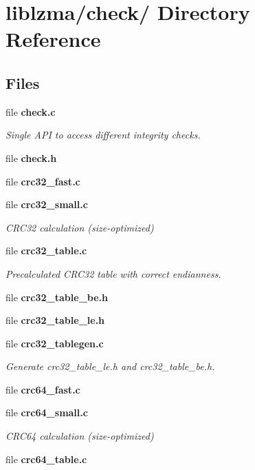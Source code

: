 \section{liblzma/check/ Directory Reference}
\label{dir_32e8ef00be12127410478e93c5f07fec}
\subsection*{Files}
\begin{DoxyCompactItemize}
\item 
file {\bf check.\-c}
\begin{DoxyCompactList}\small\item\em Single A\-P\-I to access different integrity checks. \end{DoxyCompactList}\item 
file {\bfseries check.\-h}
\item 
file {\bfseries crc32\-\_\-fast.\-c}
\item 
file {\bf crc32\-\_\-small.\-c}
\begin{DoxyCompactList}\small\item\em C\-R\-C32 calculation (size-\/optimized) \end{DoxyCompactList}\item 
file {\bf crc32\-\_\-table.\-c}
\begin{DoxyCompactList}\small\item\em Precalculated C\-R\-C32 table with correct endianness. \end{DoxyCompactList}\item 
file {\bfseries crc32\-\_\-table\-\_\-be.\-h}
\item 
file {\bfseries crc32\-\_\-table\-\_\-le.\-h}
\item 
file {\bf crc32\-\_\-tablegen.\-c}
\begin{DoxyCompactList}\small\item\em Generate crc32\-\_\-table\-\_\-le.\-h and crc32\-\_\-table\-\_\-be.\-h. \end{DoxyCompactList}\item 
file {\bfseries crc64\-\_\-fast.\-c}
\item 
file {\bf crc64\-\_\-small.\-c}
\begin{DoxyCompactList}\small\item\em C\-R\-C64 calculation (size-\/optimized) \end{DoxyCompactList}\item 
file {\bf crc64\-\_\-table.\-c}

\end{DoxyCompactItemize}
